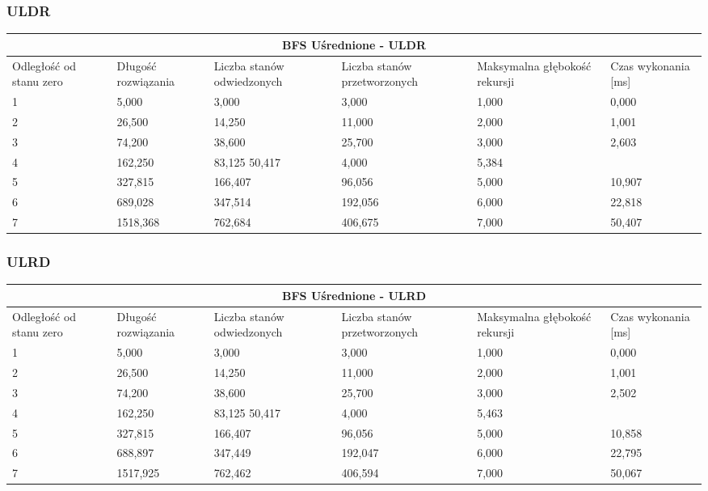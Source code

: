\documentclass{classrep}
\begin{document}
{\subsubsection{ULDR}
\begin{center}
	\begin{tabular}{ | p{1.6cm} | p{1.4cm} | p{1.8cm} | p{2cm} | p{2.2cm} | p{2cm} | }
	\hline
	\multicolumn{6}{|c|}{BFS Uśrednione - ULDR} \\
	\hline
	Odległość od stanu zero & Długość rozwiązania & Liczba stanów odwiedzonych & Liczba stanów przetworzonych & Maksymalna głębokość rekursji & Czas wykonania [ms]\\
	\hline
	1&5,000&3,000&3,000&1,000&0,000\\
	\hline
	2&26,500&14,250&11,000&2,000&1,001\\
	\hline
	3&74,200&38,600&25,700&3,000&2,603\\
	\hline
	4&162,250&83,125	50,417&4,000&5,384\\
	\hline
	5&327,815&166,407&96,056&5,000&10,907\\
	\hline
	6&689,028&347,514&192,056&6,000&22,818\\
	\hline
	7&1518,368&762,684&406,675&7,000&50,407\\
	\hline
	\end{tabular}
\end{center}

\subsubsection{ULRD}
\begin{center}
	\begin{tabular}{ | p{1.6cm} | p{1.4cm} | p{1.8cm} | p{2cm} | p{2.2cm} | p{2cm} | }
	\hline
	\multicolumn{6}{|c|}{BFS Uśrednione - ULRD} \\
	\hline
	Odległość od stanu zero & Długość rozwiązania & Liczba stanów odwiedzonych & Liczba stanów przetworzonych & Maksymalna głębokość rekursji & Czas wykonania [ms]\\
	\hline
	1&5,000&3,000&3,000&1,000&0,000\\
	\hline
	2&26,500&14,250&11,000&2,000&1,001\\
	\hline
	3&74,200&38,600&25,700&3,000&2,502\\
	\hline
	4&162,250&83,125	50,417&4,000&5,463\\
	\hline
	5&327,815&166,407&96,056&5,000&10,858\\
	\hline
	6&688,897&347,449&192,047&6,000&22,795\\
	\hline
	7&1517,925&762,462&406,594&7,000&50,067\\
	\hline
	\end{tabular}
\end{center}

}
\end{document}
